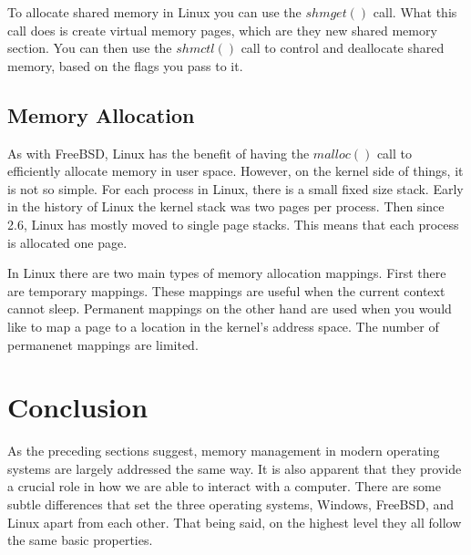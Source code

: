\documentclass[letterpaper,10pt,titlepage,draftclsnofoot,onecolumn]{IEEEtran}
\begin{document}
To allocate shared memory in Linux you can use the $shmget()$ call. What this call does is create virtual memory pages, which are they new shared memory section. You can then use the $shmctl()$ call to control and deallocate shared memory, based on the flags you pass to it. \cite{linux}

\subsection{Memory Allocation}
As with FreeBSD, Linux has the benefit of having the $malloc()$ call to efficiently allocate memory in user space. However, on the kernel side of things, it is not so simple. For each process in Linux, there is a small fixed size stack. Early in the history of Linux the kernel stack was two pages per process. Then since 2.6, Linux has mostly moved to single page stacks. This means that each process is allocated one page. \cite{linux}

In Linux there are two main types of memory allocation mappings. First there are temporary mappings. These mappings are useful when the current context cannot sleep. Permanent mappings on the other hand are used when you would like to map a page to a location in the kernel's address space. The number of permanenet mappings are limited. \cite{linux}

\section{Conclusion}
As the preceding sections suggest, memory management in modern operating systems are largely addressed the same way. It is also apparent that they provide a crucial role in how we are able to interact with a computer. There are some subtle differences that set the three operating systems, Windows, FreeBSD, and Linux apart from each other. That being said, on the highest level they all follow the same basic properties.



\end{document}
